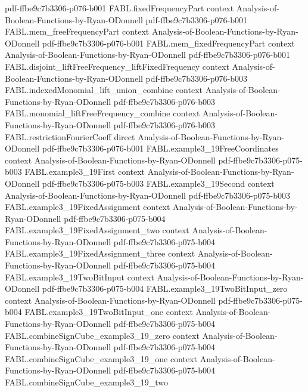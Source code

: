 \begin{theorem}
  {pdf-ffbe9c7b3306-p076-b001}
\proofstep
  {FABL.fixedFrequencyPart}
  {context}
  {Analysis-of-Boolean-Functions-by-Ryan-ODonnell}
  {pdf-ffbe9c7b3306-p076-b001}
\proofstep
  {FABL.mem_freeFrequencyPart}
  {context}
  {Analysis-of-Boolean-Functions-by-Ryan-ODonnell}
  {pdf-ffbe9c7b3306-p076-b001}
\proofstep
  {FABL.mem_fixedFrequencyPart}
  {context}
  {Analysis-of-Boolean-Functions-by-Ryan-ODonnell}
  {pdf-ffbe9c7b3306-p076-b001}
\proofstep
  {FABL.disjoint_liftFreeFrequency_liftFixedFrequency}
  {context}
  {Analysis-of-Boolean-Functions-by-Ryan-ODonnell}
  {pdf-ffbe9c7b3306-p076-b003}
\proofstep
  {FABL.indexedMonomial_lift_union_combine}
  {context}
  {Analysis-of-Boolean-Functions-by-Ryan-ODonnell}
  {pdf-ffbe9c7b3306-p076-b003}
\proofstep
  {FABL.monomial_liftFreeFrequency_combine}
  {context}
  {Analysis-of-Boolean-Functions-by-Ryan-ODonnell}
  {pdf-ffbe9c7b3306-p076-b003}
\proofstep
  {FABL.restrictionFourierCoeff}
  {direct}
  {Analysis-of-Boolean-Functions-by-Ryan-ODonnell}
  {pdf-ffbe9c7b3306-p076-b001}
\proofstep
  {FABL.example3_19FreeCoordinates}
  {context}
  {Analysis-of-Boolean-Functions-by-Ryan-ODonnell}
  {pdf-ffbe9c7b3306-p075-b003}
\proofstep
  {FABL.example3_19First}
  {context}
  {Analysis-of-Boolean-Functions-by-Ryan-ODonnell}
  {pdf-ffbe9c7b3306-p075-b003}
\proofstep
  {FABL.example3_19Second}
  {context}
  {Analysis-of-Boolean-Functions-by-Ryan-ODonnell}
  {pdf-ffbe9c7b3306-p075-b003}
\proofstep
  {FABL.example3_19FixedAssignment}
  {context}
  {Analysis-of-Boolean-Functions-by-Ryan-ODonnell}
  {pdf-ffbe9c7b3306-p075-b004}
\proofstep
  {FABL.example3_19FixedAssignment_two}
  {context}
  {Analysis-of-Boolean-Functions-by-Ryan-ODonnell}
  {pdf-ffbe9c7b3306-p075-b004}
\proofstep
  {FABL.example3_19FixedAssignment_three}
  {context}
  {Analysis-of-Boolean-Functions-by-Ryan-ODonnell}
  {pdf-ffbe9c7b3306-p075-b004}
\proofstep
  {FABL.example3_19TwoBitInput}
  {context}
  {Analysis-of-Boolean-Functions-by-Ryan-ODonnell}
  {pdf-ffbe9c7b3306-p075-b004}
\proofstep
  {FABL.example3_19TwoBitInput_zero}
  {context}
  {Analysis-of-Boolean-Functions-by-Ryan-ODonnell}
  {pdf-ffbe9c7b3306-p075-b004}
\proofstep
  {FABL.example3_19TwoBitInput_one}
  {context}
  {Analysis-of-Boolean-Functions-by-Ryan-ODonnell}
  {pdf-ffbe9c7b3306-p075-b004}
\proofstep
  {FABL.combineSignCube_example3_19_zero}
  {context}
  {Analysis-of-Boolean-Functions-by-Ryan-ODonnell}
  {pdf-ffbe9c7b3306-p075-b004}
\proofstep
  {FABL.combineSignCube_example3_19_one}
  {context}
  {Analysis-of-Boolean-Functions-by-Ryan-ODonnell}
  {pdf-ffbe9c7b3306-p075-b004}
\proofstep
  {FABL.combineSignCube_example3_19_two}

\end{theorem}

